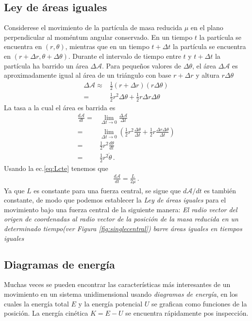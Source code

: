 \subsection{Ley de áreas iguales}

Considerese el movimiento de la partícula de masa reducida $\mu$ en el plano perpendicular al moméntum angular conservado. En un tiempo $t$ la partícula se encuentra en $(r,\theta)$, mientras que en un tiempo $t+\Delta t$ la partícula se encuentra en $(r+\Delta r,\theta+\Delta \theta)$. Durante el intervalo de tiempo entre $t$ y $t+\Delta t$ la partícula ha barrido un área $\Delta \mathcal{A}$. Para pequeños valores de $\Delta \theta$, el área $\Delta \mathcal{A}$ es aproximadamente igual al área de un triángulo con base $r+\Delta r$ y altura $r\Delta\theta$
\begin{align}
  \Delta \mathcal{A}\approx& \tfrac{1}{2}(r+\Delta r)(r\Delta\theta)\nonumber\\
  =& \tfrac{1}{2}r^2\Delta\theta+\tfrac{1}{2}r\Delta r\Delta\theta
\end{align}
La tasa a la cual el área es barrida es
\begin{align}
  \frac{d\mathcal{A}}{dt}=&\lim_{\Delta t\to 0}\frac{\Delta \mathcal{A}}{\Delta t}\nonumber\\
  =&\lim_{\Delta t\to 0}\left(\frac{1}{2}r^2\frac{\Delta\theta}{\Delta t}+\frac{1}{2}r\frac{\Delta r\Delta\theta}{\Delta t}\right)\nonumber\\
  =&\frac{1}{2}r^2\frac{d\theta}{dt}\nonumber\\
  =&\frac{1}{2}r^2\dot{\theta}\,.
\end{align}
Usando la ec.\eqref{eq:Lcte} tenemos que
\begin{align}
  \label{eq:leyareas}
  \frac{d\mathcal{A}}{dt}=\frac{L}{2\mu}\,.
\end{align}
Ya que $L$ es constante para una fuerza central, se sigue que $d\mathcal{A}/dt$ es también constante, de modo que podemos establecer la \emph{Ley de áreas iguales} para el movimiento bajo una fuerza central de la siguiente manera: \emph{El radio vector del origen de coordenadas al radio vector de la posición de la masa reducida en un determinado tiempo(ver Figura \ref{fig:singlecentral}) barre áreas iguales en tiempos iguales} 


\subsection{Diagramas de energía}
Muchas veces se pueden encontrar las características más interesantes de un movimiento en un sistema unidimensional usando \emph{diagramas de energía}, en los cuales la energía total $E$ y la energía potencial $U$ se grafican como funciones de la posición. La energía cinética $K=E-U$ se encuentra rápidamente pos inspección.

